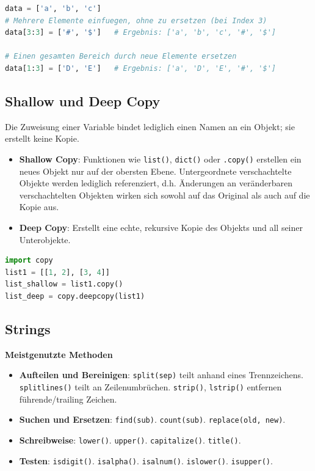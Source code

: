 \begin{lstlisting}[language=Python]
data = ['a', 'b', 'c']
# Mehrere Elemente einfuegen, ohne zu ersetzen (bei Index 3)
data[3:3] = ['#', '$']   # Ergebnis: ['a', 'b', 'c', '#', '$']

# Einen gesamten Bereich durch neue Elemente ersetzen
data[1:3] = ['D', 'E']   # Ergebnis: ['a', 'D', 'E', '#', '$']
\end{lstlisting}

\subsection{Shallow und Deep Copy}
Die Zuweisung einer Variable bindet lediglich einen Namen an ein Objekt; sie erstellt keine Kopie.



\begin{itemize}
    \item \textbf{Shallow Copy}: Funktionen wie \texttt{list()}, \texttt{dict()} oder \texttt{.copy()} erstellen ein neues Objekt nur auf der obersten Ebene. Untergeordnete verschachtelte Objekte werden lediglich referenziert, d.h. Änderungen an veränderbaren verschachtelten Objekten wirken sich sowohl auf das Original als auch auf die Kopie aus.
    \item \textbf{Deep Copy}: Erstellt eine echte, rekursive Kopie des Objekts und all seiner Unterobjekte.
\end{itemize}

\begin{lstlisting}[language=Python]
import copy
list1 = [[1, 2], [3, 4]]
list_shallow = list1.copy()
list_deep = copy.deepcopy(list1)
\end{lstlisting}

\subsection{Strings}

\textbf{Meistgenutzte Methoden}
\begin{itemize}
    \item \textbf{Aufteilen und Bereinigen}: \texttt{split(sep)} teilt anhand eines Trennzeichens. \texttt{splitlines()} teilt an Zeilenumbrüchen. \texttt{strip()}, \texttt{lstrip()} entfernen führende/trailing Zeichen.
    \item \textbf{Suchen und Ersetzen}: \texttt{find(sub)}. \texttt{count(sub)}. \texttt{replace(old, new)}.
    \item \textbf{Schreibweise}: \texttt{lower()}. \texttt{upper()}. \texttt{capitalize()}. \texttt{title()}.
    \item \textbf{Testen}: \texttt{isdigit()}. \texttt{isalpha()}. \texttt{isalnum()}. \texttt{islower()}. \texttt{isupper()}.
\end{itemize}

